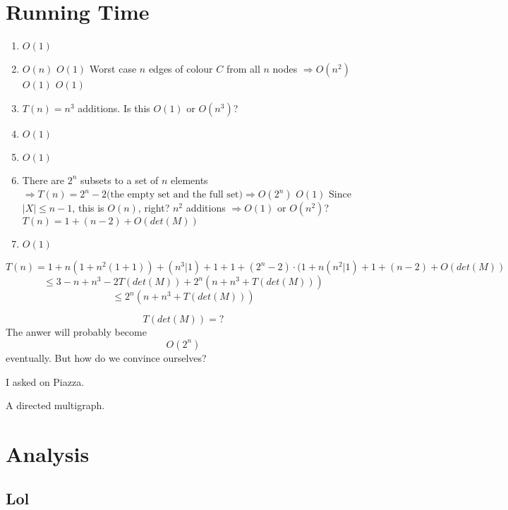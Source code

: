 \documentclass{tufte-handout}
\begin{document}
\section{Running Time}
\begin{enumerate}
\item $O(1)$
\item $O(n)$
\subitem $O(1)$
\subitem Worst case $n$ edges of colour $C$ from all $n$ nodes $\Rightarrow O(n^2)$
\subsubitem $O(1)$
\subsubitem $O(1)$
\item $T(n) = n^3$ additions. Is this $O(1)$ or $O(n^3)$?
\item $O(1)$
\item $O(1)$
\item There are $2^n$ subsets to a set of $n$ elements $\Rightarrow T(n) = 2^n - 2\text{(the empty set and the full set)} \Rightarrow O(2^n)$
\subitem $O(1)$
\subitem Since $|X| \leq n-1$, this is $O(n)$, right?
\subsubitem $n^2$ additions $\Rightarrow O(1)$ or $O(n^2)$?
\subitem $T(n) = 1 + (n-2) + O(det(M))$
\item $O(1)$
\end{enumerate}


$$T(n) = 1 + n(1 + n^2(1 + 1)) + (n^3 | 1) + 1 + 1 + (2^n - 2)\cdot(1 + n(n^2 | 1) + 1 + (n - 2) + O(det(M))$$ 
$$ \leq 3 - n + n^3 - 2T(det(M)) + 2^n(n + n^3 + T(det(M)))$$
$$ \leq 2^n(n + n^3 + T(det(M)))$$

$$T(det(M)) = ?$$
The anwer will probably become
$$O(2^n)$$
eventually. But how do we convince ourselves?

I asked on Piazza.

\newpage
\begin{marginfigure}
\caption{A directed multigraph.}
\end{marginfigure}

\section{Analysis}

\subsection{Lol}
\end{document}
